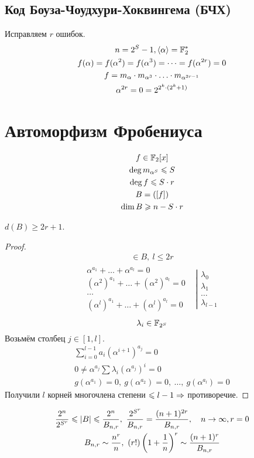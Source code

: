 \subsection{Код Боуза-Чоудхури-Хоквингема (БЧХ)}
Исправляем $r$ ошибок.
\begin{gather}
  n = 2^S - 1, \langle \alpha \rangle = \FF_2^* \\
  f(\alpha) = f(\alpha^2) = f(\alpha^3) = \dots = f(\alpha^{2r}) = 0 \\
  f = m_\alpha \cd m_{\alpha^3} \cd \dots \cd m_{\alpha^{2r - 1}} \\
  \alpha ^{2r} = 0 = 2^{2^k \cd (2^k + 1)}
\end{gather}

\section{Автоморфизм Фробениуса}
\begin{gather}
  f \in \mathbb{F}_2[x] \\
  \deg m_{\alpha^S} \leqslant S \\
  \deg f \leqslant S \cdot r \\
  B = ([f]) \\
  \dim B \geqslant n - S \cdot r \\
\end{gather} 

\begin{theorem}
  $d(B) \geq 2r + 1$.
\end{theorem}
\begin{proof}
  \begin{gather}
    [x^{a_1} + \dots + x^{a_l}] \in B, \ l \leq 2r
  \end{gather}
  \[
  \begin{matrix}
  \begin{matrix}
    \alpha^{a_1} + \dots + \alpha^{a_l} = 0 \\
    (\alpha^2)^{a_1} + \dots + (\alpha^2)^{a_l} = 0 \\
    \dots \\
    (\alpha^l)^{a_1} + \dots + (\alpha^l)^{a_l} = 0
  \end{matrix}
  &
  \left\lvert
  \begin{matrix}
    \lambda_0 \\
    \lambda_1 \\
    \dots \\
    \lambda_{l - 1} 
  \end{matrix}
  \right.
  \end{matrix}
  \]
  \[\lambda_i \in \mathbb{F}_{2^S}\]
  Возьмём столбец $j \in [1, l]$.
  \begin{gather}
    \sum_{i = 0}^{l - 1}a_i(\alpha^{i + 1})^{a_j} = 0 \\
    0 \neq \alpha^{a_j} \sum \lambda_i (\alpha^{a_j})^i = 0 \\
    g(\alpha^{a_1}) = 0, \ g(\alpha^{a_2}) = 0, \  \dots, \  g(\alpha^{a_l}) = 0
  \end{gather}
  Получили $l$ корней многочлена степени $\leqslant l - 1 \Rightarrow$ противоречие.
\end{proof}

\begin{gather}
  \frac{2^n}{2^{S^r}} \leq |B| \leq \frac{2^n}{B_{n, r}}, \ \frac{2^{S^r}}{B_{n, r}} = \frac{(n + 1)^{2r}}{B_{n, r}}, \quad n \ra \infty, r = 0 \\
  B_{n, r} \sim \frac{n^r}{n}, \ (r!)\left(1 + \frac{1}{n}\right)^r \sim \frac{(n + 1)^r}{B_{n, r}}
\end{gather}
